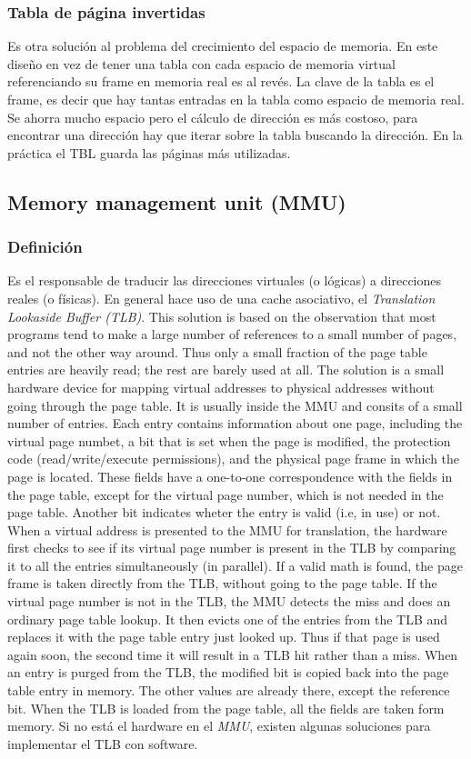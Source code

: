 \documentclass[a4paper, twoside]{article}
\begin{document}
\subsubsection{Tabla de página invertidas}
Es otra solución al problema del crecimiento del espacio de memoria.
En este diseño en vez de tener una tabla con cada espacio de memoria virtual referenciando su frame en memoria real es al revés.
La clave de la tabla es el frame, es decir que hay tantas entradas en la tabla como espacio de memoria real.
Se ahorra mucho espacio pero el cálculo de dirección es más costoso, para encontrar una dirección hay que iterar sobre la tabla buscando la dirección.
En la práctica el TBL guarda las páginas más utilizadas.

\subsection{Memory management unit (MMU)}
\subsubsection{Definición}
Es el responsable de traducir las direcciones virtuales (o lógicas) a direcciones reales (o físicas).
En general hace uso de una cache asociativo, el \emph{Translation Lookaside Buffer (TLB)}.
This solution is based on the observation that most programs tend to make a large number of references to a small number of pages, and not the other way around. Thus only a small fraction of the page table entries are heavily read; the rest are barely used at all.
The solution is a small hardware device for mapping virtual addresses to physical addresses without going through the page table. It is usually inside the MMU and consits of a small number of entries. Each entry contains information about one page, including the virtual page numbet, a bit that is set when the page is modified, the protection code (read/write/execute permissions), and the physical page frame in which the page is located. These fields have a one-to-one correspondence with the fields in the page table, except for the virtual page number, which is not needed in the page table. Another bit indicates wheter the entry is valid (i.e, in use) or not.
When a virtual address is presented to the MMU for translation, the hardware first checks to see if its virtual page number is present in the TLB by comparing it to all the entries simultaneously (in parallel). If a valid math is found, the page frame is taken directly from the TLB, without going to the page table.
If the virtual page number is not in the TLB, the MMU detects the miss and does an ordinary page table lookup. It then evicts one of the entries from the TLB and replaces it with the page table entry just looked up. Thus if that page is used again soon, the second time it will result in a TLB hit rather than a miss. When an entry is purged from the TLB, the modified bit is copied back into the page table entry in memory. The other values are already there, except the reference bit. When the TLB is loaded from the page table, all the fields are taken form memory.
Si no está el hardware en el \emph{MMU}, existen algunas soluciones para implementar el TLB con software.
\end{document}
